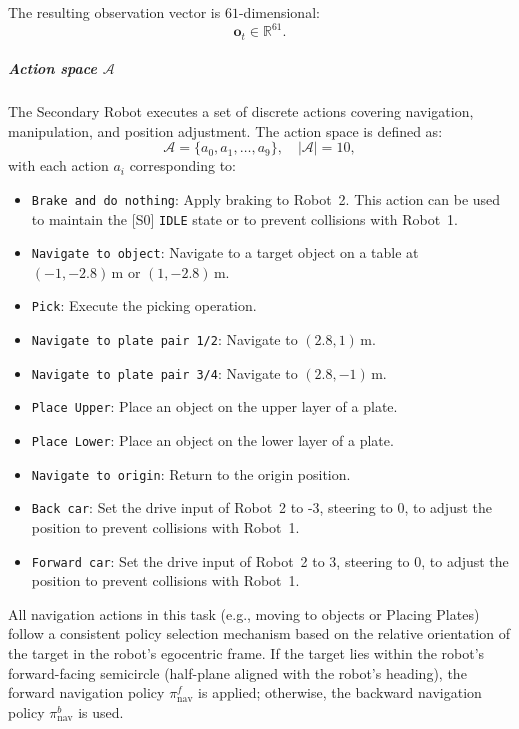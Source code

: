\documentclass[english, 12pt, a4paper, elec, utf8, a-2b, online]{aaltothesis}
\begin{document}
The resulting observation vector is $61$-dimensional:
\begin{equation}
\mathbf{o}_t \in \mathbb{R}^{61}.
\end{equation}

\subparagraph{Action space $\mathcal{A}$}
The Secondary Robot executes a set of discrete actions covering navigation, manipulation, and position adjustment. The action space is defined as:
\begin{equation}
\mathcal{A} = \{a_0, a_1, \dots, a_{9}\}, \quad |\mathcal{A}| = 10 ,
\end{equation}
with each action $a_i$ corresponding to:


\begin{itemize}
    \item[$a_0$] \texttt{Brake and do nothing}: Apply braking to Robot~2. This action can be used to maintain the [S0] \texttt{IDLE} state or to prevent collisions with Robot~1.
    \item[$a_1$] \texttt{Navigate to object}: Navigate to a target object on a table at $( -1, -2.8 )\,\text{m}$ or $( 1, -2.8 )\,\text{m}$.
    \item[$a_2$] \texttt{Pick}: Execute the picking operation.
    \item[$a_3$] \texttt{Navigate to plate pair 1/2}: Navigate to $( 2.8, 1 )\,\text{m}$.
    \item[$a_4$] \texttt{Navigate to plate pair 3/4}: Navigate to $( 2.8, -1 )\,\text{m}$.
    \item[$a_5$] \texttt{Place Upper}: Place an object on the upper layer of a plate.
    \item[$a_6$] \texttt{Place Lower}: Place an object on the lower layer of a plate.
    \item[$a_7$] \texttt{Navigate to origin}: Return to the origin position.
    \item[$a_8$] \texttt{Back car}: Set the drive input of Robot~2 to -3, steering to 0, to adjust the position to prevent collisions with Robot~1.
    \item[$a_9$] \texttt{Forward car}: Set the drive input of Robot~2 to 3, steering to 0, to adjust the position to prevent collisions with Robot~1.
\end{itemize}

All navigation actions in this task (e.g., moving to objects or Placing Plates) follow a consistent policy selection mechanism based on the relative orientation of the target in the robot’s egocentric frame. 
If the target lies within the robot’s forward-facing semicircle (half-plane aligned with the robot’s heading), 
the forward navigation policy $\pi_{\text{nav}}^{f}$ is applied; otherwise, 
the backward navigation policy $\pi_{\text{nav}}^{b}$ is used. 
\end{document}
